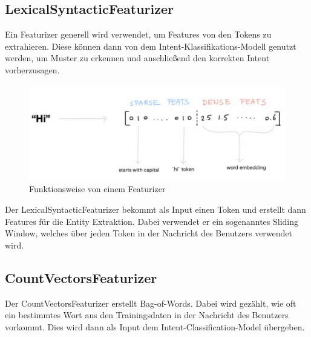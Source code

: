 \subsection{LexicalSyntacticFeaturizer}

Ein Featurizer generell wird verwendet, um Features von den Tokens zu extrahieren.
Diese können dann von dem Intent-Klassifikations-Modell genutzt werden, um Muster zu erkennen und anschließend den korrekten Intent vorherzusagen.\cite{lexicalSyntacticFeaturizer, pipelineComponentsYoutube, pipelineConfigurationVideo}

\begin{figure}[hbt!]
  \centering
  \includegraphics[scale=0.5]{pics/featurizer}
  \caption{Funktionsweise von einem Featurizer~\cite{pipelineConfigurationVideo}}
  \label{fig:Featurizer}
\end{figure}

Der LexicalSyntacticFeaturizer bekommt als Input einen Token und erstellt dann Features für die Entity Extraktion.
Dabei verwendet er ein sogenanntes Sliding Window, welches über jeden Token in der Nachricht des Benutzers verwendet wird.\cite{lexicalSyntacticFeaturizer, pipelineComponentsYoutube, pipelineConfigurationVideo}

\subsection{CountVectorsFeaturizer}

Der CountVectorsFeaturizer erstellt Bag-of-Words.
Dabei wird gezählt, wie oft ein bestimmtes Wort aus den Trainingsdaten in der Nachricht des Benutzers vorkommt.
Dies wird dann als Input dem Intent-Classification-Model übergeben.\cite{countVectorsFeaturizer, pipelineConfigurationVideo, pipelineComponentsYoutube, rasaMasterclassCountVectorsFeaturizer}

